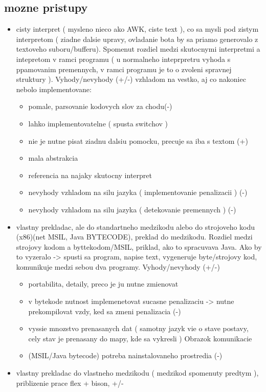 \documentclass[12pt,notitlepage]{report}
\begin{document}
\subsection{mozne pristupy}
\begin{itemize}
\item cisty interpret ( mysleno nieco ako AWK, ciste text ), co sa mysli pod zistym interpretom ( ziadne dalsie upravy, ovladanie bota by sa priamo generovalo z textoveho suboru/bufferu). Spomenut rozdiel medzi skutocnymi interpretmi a intepretom v ramci programu ( u normalneho inteprpretru vyhoda s ppamovanim premennych, v ramci programu je to o zvoleni spravnej struktury ). Vyhody/nevyhody (+/-) vzhladom na vestko, aj co nakoniec nebolo implementovane:
\begin{itemize}
\item pomale, parsovanie kodovych slov za chodu(-)
\item lahko implementovatelne ( spusta switchov )
\item nie je nutne pisat ziadnu dalsiu pomocku, precuje sa iba s textom (+)
\item mala abstrakcia
\item referencia na najaky skutocny interpret
\item nevyhody vzhladom na silu jazyka ( implementovanie penalizacii ) (-)
\item nevyhody vzhladom na silu jazyka ( detekovanie premennych ) (-)
\end{itemize}
\item vlastny prekladac, ale do standartneho medzikodu alebo do strojoveho kodu (x86)(net MSIL, Java BYTECODE), preklad do medzikodu. Rozdiel medzi strojovy kodom a byttekodom/MSIL, priklad, ako to spracuvava Java. Ako by to vyzeralo -> spusti sa program, napise text, vygeneruje byte/strojovy kod, komunikuje medzi sebou dva programy.  Vyhody/nevyhody (+/-)
\begin{itemize}
\item portabilita, detaily, preco je ju nutne zmienovat 
\item v bytekode nutnost implemenetovat sucasne penalizaciu -> nutne prekompilovat vzdy, ked sa zmeni penalizacia (-) 
\item vyssie mnozstvo prenasanych dat ( samotny jazyk vie o stave postavy, cely stav je prenasany do mapy, kde sa vykresli ) Obrazok komunikacie
\item (MSIL/Java bytecode) potreba nainstalovaneho prostredia (-)
\end{itemize}
\item vlastny prekladac do vlastneho medzikodu ( medzikod spomenuty predtym ), priblizenie prace flex + bison, +/-

\end{itemize}
\end{document}

